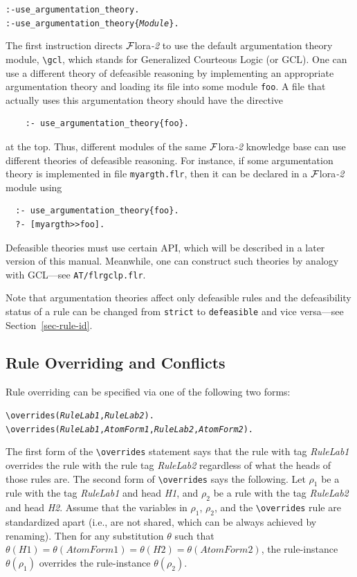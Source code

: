 \documentclass[11pt]{article}
\newcommand{\FLORA}{{\mbox{\sc ${\cal F}${lora}\rm\emph{-2}}}\xspace}
\newcommand{\FLSYSTEM}{\FLORA}
\newcommand{\flrext}{flr\xspace}
\newcommand{\bs}{\textbackslash}
\begin{document}
\begin{alltt}
  :- use_argumentation_theory.
  :- use_argumentation_theory\{\emph{Module}\}.
\end{alltt}
\index{\bs{}gcl module}
The first instruction directs \FLSYSTEM to use the default argumentation theory
module, {\tt \bs{}gcl}, which stands for Generalized Courteous Logic (or GCL).
One can use a different theory of defeasible reasoning by implementing an
appropriate argumentation theory and
loading its file into some module {\tt foo}.
A file that actually uses this argumentation theory should have
the directive
\begin{verbatim}
    :- use_argumentation_theory{foo}.
\end{verbatim}
at the top. Thus, different modules of the same \FLSYSTEM
knowledge base can use different theories of defeasible reasoning.
For instance, if some argumentation theory is implemented in file
\texttt{myargth.\flrext}, then it can be declared in a \FLSYSTEM module
using
\begin{verbatim}
  :- use_argumentation_theory{foo}.
  ?- [myargth>>foo].
\end{verbatim}

Defeasible theories must use certain API, which will
be described in a later version of this manual. Meanwhile, one can
construct such theories by analogy with GCL---see {\tt AT/flrgclp.\flrext}.  

Note that argumentation theories affect only defeasible rules and the
defeasibility status of a rule can be changed from \texttt{strict} to
\texttt{defeasible} and vice versa---see
Section~\ref{sec-rule-id}.

\subsection{Rule Overriding and Conflicts}\label{sec-overriding-conflict}

Rule overriding can be specified via one of the following two forms:
\index{\bs{}overrides predicate}
\begin{alltt}
  \bs{}overrides({\em{}RuleLab1},\emph{RuleLab2}).
  \bs{}overrides({\em{}RuleLab1},{\em{}AtomForm1},{\em{}RuleLab2},\emph{AtomForm2}).
\end{alltt}
The first form of the {\tt \bs{}overrides} statement says that the rule with
tag \emph{RuleLab1} overrides the rule with the rule tag
\emph{RuleLab2} regardless of what the heads of those rules are. The second
form of {\tt \bs{}overrides} says the following. Let $\rho_1$ be a 
rule with the tag \emph{RuleLab1} and head \emph{H1}, and $\rho_2$ be a
rule with the tag \emph{RuleLab2} and head \emph{H2}. Assume that
the variables in $\rho_1$, $\rho_2$, and the {\tt \bs{}overrides} rule are
standardized apart (i.e., are not shared, which can be always achieved by
renaming).   Then for any substitution $\theta$ such that $\theta(H1) =
\theta(AtomForm1) = \theta(H2) = \theta(AtomForm2)$, the rule-instance
$\theta(\rho_1)$ overrides the rule-instance $\theta(\rho_2)$.
\end{document}
